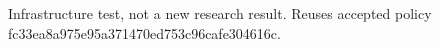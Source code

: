 Infrastructure test, not a new research result. Reuses accepted policy fc33ea8a975e95a371470ed753c96cafe304616c.
